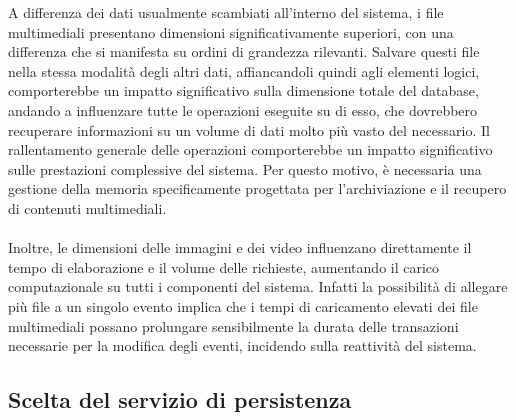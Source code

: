 A differenza dei dati usualmente scambiati all'interno del sistema, 
i file multimediali presentano dimensioni significativamente superiori, 
con una differenza che si manifesta su ordini di grandezza rilevanti. 
Salvare questi file nella stessa modalità degli altri dati, 
affiancandoli quindi agli elementi logici, 
comporterebbe un impatto significativo sulla dimensione totale del database,
andando a influenzare tutte le operazioni eseguite su di esso,
che dovrebbero recuperare informazioni su un volume di dati molto più vasto del necessario.
Il rallentamento generale delle operazioni comporterebbe
un impatto significativo sulle prestazioni complessive del sistema.
Per questo motivo, è necessaria una gestione della memoria 
specificamente progettata per l'archiviazione e il recupero di contenuti multimediali.\\
\\
Inoltre, le dimensioni delle immagini e dei video influenzano direttamente 
il tempo di elaborazione e il volume delle richieste, 
aumentando il carico computazionale su tutti i componenti del sistema. 
Infatti la possibilità di allegare più file a un singolo evento implica 
che i tempi di caricamento elevati dei file multimediali 
possano prolungare sensibilmente la durata delle transazioni necessarie per la modifica degli eventi, 
incidendo sulla reattività del sistema.\\
\subsection{Scelta del servizio di persistenza}

